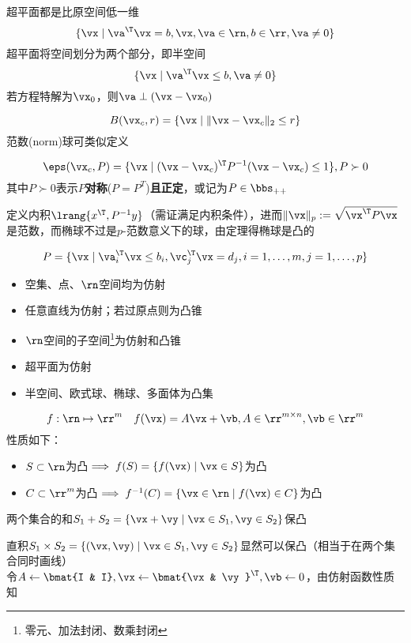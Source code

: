\begin{definition}
超平面都是比原空间低一维
\[\{\vx\mid \va^\T\vx=b,\vx,\va\in\rn,b\in\rr,\va\ne 0\}\]
超平面将空间划分为两个部分，即半空间
\[\{\vx\mid \va^\T\vx\leq b,\va\ne 0\}\]
若方程特解为$\vx_0$，则$\va\perp(\vx-\vx_0)$
\end{definition}
\begin{definition}
\[B(\vx_c,r)=\{\vx\mid\|\vx-\vx_c\|_2\leq r\}\]
范数(norm)球可类似定义
\end{definition}
\begin{definition}[椭球(ellipsoid)]
\[\eps(\vx_c,P)=\{\vx\mid(\vx-\vx_c)^\T P^{-1}(\vx-\vx_c)\leq 1\},P\succ 0\]
其中$P\succ 0$表示$P$\textbf{对称}($P=P^T$)\textbf{且正定}，或记为$P\in\bbs_{++}$
\end{definition}
\begin{analysis}
定义内积$\lrang{x^\T, P^{-1}y}$（需证满足内积条件），进而$\|\vx\|_p:=\sqrt{\vx^\T P\vx}$是范数，而椭球不过是$p$-范数意义下的球，由定理得椭球是凸的
\end{analysis}
\begin{definition}
\[P=\{\vx\mid\va_i^\T\vx\leq b_i,\vc_j^\T\vx=d_j,i=1,\ldots,m,j=1,\ldots,p\}\]
\end{definition}
\begin{example}
\begin{itemize}
	\item 空集、点、$\rn$空间均为仿射
	\item 任意直线为仿射；若过原点则为凸锥
	\item $\rn$空间的子空间\footnote{零元、加法封闭、数乘封闭}为仿射和凸锥
	\item 超平面为仿射
	\item 半空间、欧式球、椭球、多面体为凸集
\end{itemize}
\end{example}

\begin{definition}[仿射函数]
\[f:\rn\mapsto\rr^m\quad f(\vx)=A\vx+\vb,A\in\rr^{m\times n},\vb\in\rr^m\]
性质如下：
\begin{itemize}
	\item $S\subset\rn$为凸$\implies f(S)=\{f(\vx)\mid\vx\in S\}$为凸
	\item $C\subset\rr^m$为凸$\implies f^{-1}(C)=\{\vx\in\rn\mid f(\vx)\in C\}$为凸
\end{itemize}
\end{definition}
\begin{example}
两个集合的和$S_1+S_2=\{\vx+\vy\mid \vx\in S_1,\vy\in S_2\}$保凸
\end{example}
\begin{analysis}
直积$S_1\times S_2=\{(\vx,\vy)\mid \vx\in S_1,\vy\in S_2\}$显然可以保凸（相当于在两个集合同时画线）\\
令$A\gets\bmat{I & I},\vx\gets\bmat{\vx & \vy}^\T,\vb\gets 0$，由仿射函数性质知
\end{analysis}

